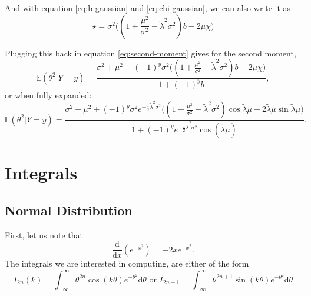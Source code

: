 \documentclass[]{report}
\begin{document}
And with equation \eqref{eq:b-gaussian} and \eqref{eq:chi-gaussian}, we can also write it as
\begin{equation}
    \star = \sigma^2\Big( (1 + \frac{\mu^2}{\sigma^2} - \tilde{\lambda}^2\sigma^2)b -2\mu \chi\Big)
\end{equation}

Plugging this back in equation \eqref{eq:second-moment} gives for the second moment,
\begin{equation}
    \mathbb{E}(\theta^2 | Y=y) = \frac{\sigma^2 + \mu^2+ (-1)^y \sigma^2\Big( (1 + \frac{\mu^2}{\sigma^2} - \tilde{\lambda}^2\sigma^2)b -2\mu \chi\Big)}{1+(-1)^yb},
\end{equation}
or when fully expanded:
\begin{equation}
    \mathbb{E}(\theta^2 | Y=y) = \frac{\sigma^2 + \mu^2+ (-1)^y \sigma^2 e^{-\frac{1}{2}\tilde{\lambda}^2\sigma^2}\Big((1 + \frac{\mu^2}{\sigma^2} - \tilde{\lambda}^2\sigma^2)\cos{\tilde{\lambda} \mu} + 2\tilde{\lambda} \mu \sin{\tilde{\lambda} \mu}\Big)}{1+(-1)^ye^{-\frac{1}{2}\tilde{\lambda}^2\sigma^2}\cos(\tilde{\lambda}\mu)}.
\end{equation}


\appendix

\chapter{Integrals}
\section{Normal Distribution}
First, let us note that
\[
\frac{\text{d}}{\text{d}x}(e^{- x^2}) = - 2 x e^{ - x ^2}
.\]
The integrals we are interested in computing, are either of the form
\[
	I_{2n}(k) = \int_{- \infty}^{\infty} \theta^{2n} \cos (k \theta) e^{ - \theta^2}\text{d}\theta \text{ or } I_{2n + 1} = \int_{- \infty}^{\infty} \theta^{2n + 1} \sin (k \theta) e^{ - \theta^2}\text{d} \theta
\]



\end{document}
